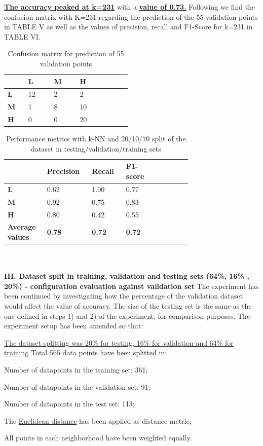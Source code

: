 \documentclass[11pt,a4paper]{article}
\newcommand{\SubItem}[1]{
  {\setlength\itemindent{13pt} \item[◦] #1}
}
\begin{document}
\uline{\textbf{The accuracy peaked at k=231}} with a \uline{\textbf{value of 0.73.}}
Following we find the confusion matrix with K=231 regarding the prediction of the 55 validation points in TABLE V as well as the values of precision, recall and F1-Score for k=231 in TABLE VI.
\begin{table}
\centering
\begin{tabular}{p{0.12\linewidth}|p{0.15\linewidth}|p{0.15\linewidth}|p{0.15\linewidth}|p{0.15\linewidth}} \hline
&\textbf{L}&\textbf{M}&\textbf{H}\\ \hline
\textbf{L}&12&2&2\\ \hline
\textbf{M}&1&8&10\\ \hline
\textbf{H}&0&0&20\\ \hline
\end{tabular}
\caption{Confusion matrix for prediction of 55 validation points}
\label{tab:Confusion matrix for prediction of 55 validation points}
\end{table}
\begin{table}
\centering
\begin{tabular}{p{0.12\linewidth}|p{0.15\linewidth}|p{0.15\linewidth}|p{0.15\linewidth}|p{0.15\linewidth}} \hline
&\textbf{Precision}&\textbf{Recall}&\textbf{F1-score}\\ \hline
\textbf{L}&0.62&1.00&0.77\\ \hline
\textbf{M}&0.92&0.75&0.83\\ \hline
\textbf{H}&0.80&0.42&0.55\\ \hline
\textbf{Average values}&\textbf{0.78}&\textbf{0.72}&\textbf{0.72}\\ \hline
\end{tabular}
\caption{Performance metrics with k-NN and 20/10/70 split of the dataset in testing/validation/training sets}
\label{tab:Performance metrics with k-NN and 20/10/70 split of the dataset}
\end{table}
\\
\\
\textbf{III. Dataset split in training, validation and testing sets (64\%, 16\% , 20\%) - configuration evaluation against validation set}
The experiment has been continued by investigating how the percentage of the validation dataset would affect the value of accuracy. The size of the testing set is the same as the one defined in steps 1) and 2) of the experiment, for comparison purposes. The experiment setup has been amended so that:
\begin{itemize}
\item \uline{The dataset splitting was 20\% for testing, 16\% for validation and 64\% for training} Total 565 data points have been splitted in:
\SubItem{Number of datapoints in the training set: 361;}
\SubItem{Number of datapoints in the validation set: 91;}
\SubItem{Number of datapoints in the test set: 113;}
\item The \uline{Euclidean distance} has been applied as distance metric;
\item All points in each neighborhood have been weighted equally.
\end{itemize}
\end{document}
